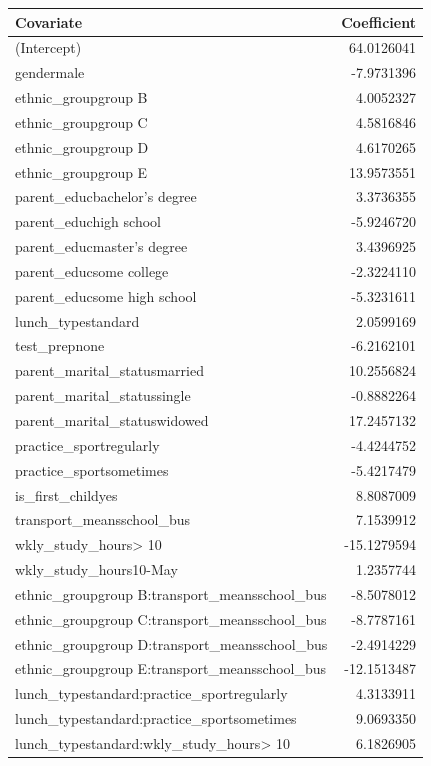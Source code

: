 \documentclass[
]{article}
\begin{document}
\begin{longtable}[]{@{}lr@{}}
\toprule\noalign{}
Covariate & Coefficient \\
\midrule\noalign{}
\endhead
\bottomrule\noalign{}
\endlastfoot
(Intercept) & 64.0126041 \\
gendermale & -7.9731396 \\
ethnic\_groupgroup B & 4.0052327 \\
ethnic\_groupgroup C & 4.5816846 \\
ethnic\_groupgroup D & 4.6170265 \\
ethnic\_groupgroup E & 13.9573551 \\
parent\_educbachelor's degree & 3.3736355 \\
parent\_educhigh school & -5.9246720 \\
parent\_educmaster's degree & 3.4396925 \\
parent\_educsome college & -2.3224110 \\
parent\_educsome high school & -5.3231611 \\
lunch\_typestandard & 2.0599169 \\
test\_prepnone & -6.2162101 \\
parent\_marital\_statusmarried & 10.2556824 \\
parent\_marital\_statussingle & -0.8882264 \\
parent\_marital\_statuswidowed & 17.2457132 \\
practice\_sportregularly & -4.4244752 \\
practice\_sportsometimes & -5.4217479 \\
is\_first\_childyes & 8.8087009 \\
transport\_meansschool\_bus & 7.1539912 \\
wkly\_study\_hours\textgreater{} 10 & -15.1279594 \\
wkly\_study\_hours10-May & 1.2357744 \\
ethnic\_groupgroup B:transport\_meansschool\_bus & -8.5078012 \\
ethnic\_groupgroup C:transport\_meansschool\_bus & -8.7787161 \\
ethnic\_groupgroup D:transport\_meansschool\_bus & -2.4914229 \\
ethnic\_groupgroup E:transport\_meansschool\_bus & -12.1513487 \\
lunch\_typestandard:practice\_sportregularly & 4.3133911 \\
lunch\_typestandard:practice\_sportsometimes & 9.0693350 \\
lunch\_typestandard:wkly\_study\_hours\textgreater{} 10 & 6.1826905 \\

\end{longtable}
\end{document}
